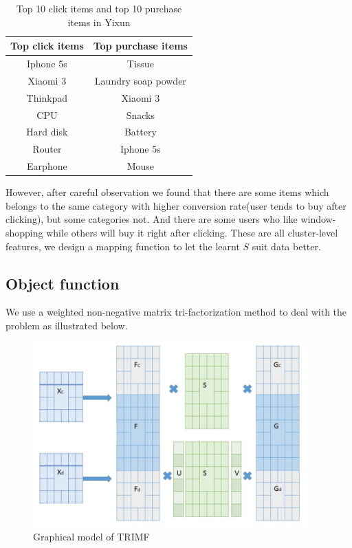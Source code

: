 \begin{table}[h]

\label{tbl:topitem}
\begin{center}
\begin{tabular}{| c | c |}
\hline
Top click items & Top purchase items \\
\hline
Iphone 5s & Tissue\\
Xiaomi 3 & Laundry soap powder\\
Thinkpad & Xiaomi 3\\
CPU & Snacks\\
Hard disk & Battery\\
Router & Iphone 5s\\
Earphone & Mouse\\
\hline
\end{tabular}
\caption{Top 10 click items and top 10 purchase items in Yixun}
\end{center}
\end{table}

\par{However, after careful observation we found that there are some items which belongs to the same category with higher conversion rate(user tends to buy after clicking), but some categories not. And there are some users who like window-shopping while others will buy it right after clicking. These are all cluster-level features, we design a mapping function to let the learnt $S$ suit data better.}

\subsection{Object function}
\par{We use a weighted non-negative matrix tri-factorization method to deal with the problem as illustrated below. 
\begin{figure}

\label{fig:trimf}
\begin{center}
\includegraphics[width=400px]{fig/trimf.jpg} 
\caption{Graphical model of TRIMF}
\end{center}
\end{figure}}
 
